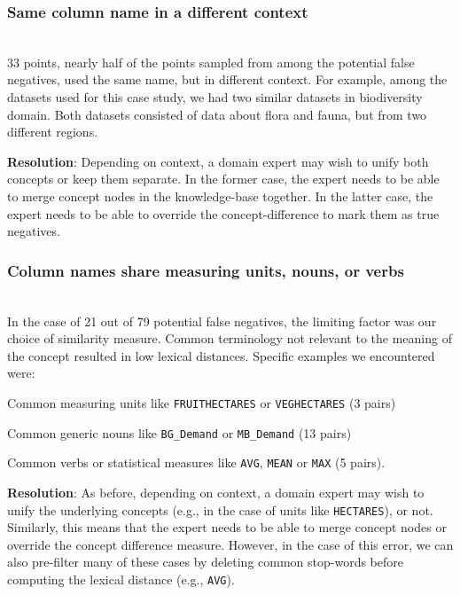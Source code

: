 \smallskip
\subsubsection{Same column name in a different context}~\\
33 points, nearly half of the points sampled from among the potential false negatives, used the same name, but in different context.
For example, among the datasets used for this case study, we had two similar datasets in biodiversity domain. 
Both datasets consisted of data about flora and fauna, but from two different regions.

\textbf{Resolution}: Depending on context, a domain expert may wish to unify both concepts or keep them separate.
In the former case, the expert needs to be able to merge concept nodes in the knowledge-base together.  
In the latter case, the expert needs to be able to override the concept-difference to mark them as true negatives.

\smallskip
\subsubsection{Column names share measuring units, nouns, or verbs}~\\
In the case of 21 out of 79 potential false negatives, the limiting factor was our choice of similarity measure.
Common terminology not relevant to the meaning of the concept resulted in low lexical distances.
Specific examples we encountered were:
\begin{enumerate*}
\item Common measuring units like \texttt{FRUITHECTARES} or \texttt{VEGHECTARES} (3 pairs)
\item Common generic nouns like \texttt{BG\_Demand} or \texttt{MB\_Demand} (13 pairs)
\item Common verbs or statistical measures like \texttt{AVG}, \texttt{MEAN} or \texttt{MAX} (5 pairs).
\end{enumerate*}

\textbf{Resolution}:
As before, depending on context, a domain expert may wish to unify the underlying concepts (e.g., in the case of units like \texttt{HECTARES}), or not.
Similarly, this means that the expert needs to be able to merge concept nodes or override the concept difference measure.
However, in the case of this error, we can also pre-filter many of these cases by deleting common stop-words before computing the lexical distance (e.g., \texttt{AVG}).  

